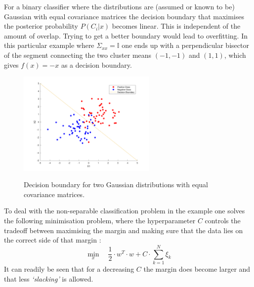 

For a binary classifier where the distributions are (assumed or known to be) Gaussian with equal covariance matrices the decision boundary that maximises the posterior probability $P(C_i|x)$ becomes linear. This is independent of the amount of overlap. Trying to get a better boundary would lead to overfitting. In this particular example where $\Sigma_{xx}=\mathbb{I}$ one ends up with a perpendicular bisector of the segment connecting the two cluster means 
$(-1,-1)$ and $(1,1)$, which gives $f(x)=-x$ as a decision boundary.

\begin{figure}[h]
\centering
\includegraphics[width=0.6\textwidth]{../src/figures/twogaussians.pdf}
\label{twogaussians}
\caption{Decision boundary for two Gaussian distributions with equal covariance matrices.}
\end{figure}


To deal with the non-separable classification problem in the example one solves the following minimisation problem, where the hyperparameter $C$ controls the tradeoff between maximising the margin and making sure that the data lies on the correct side of that margin :
$$\min_x\quad\frac{1}{2}\cdot w^T\cdot w+C\cdot \sum_{k=1}^N\xi_k$$
\noindent It can readily be seen that for a decreasing $C$ the margin does become larger and that less \textit{`slacking'} is allowed.